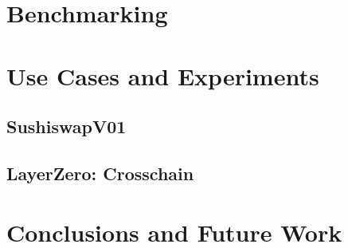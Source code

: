 \documentclass[runningheads]{llncs}
\begin{document}
\section{Benchmarking}

\section{Use Cases and Experiments}

\subsection{SushiswapV01}

\subsection{LayerZero: Crosschain}

\section{Conclusions and Future Work}
\end{document}
